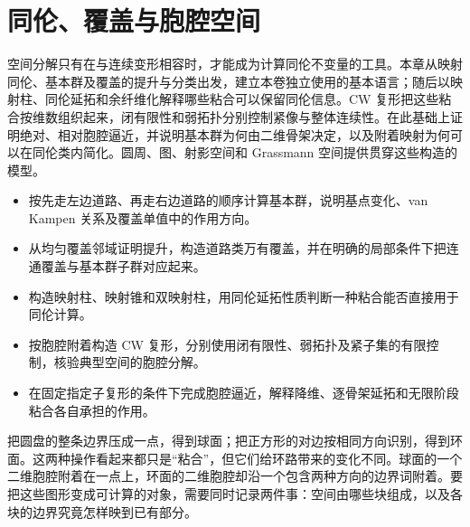 
% 
% 

\chapter{同伦、覆盖与胞腔空间}
\label{g2:ch:01}

\begin{chapterabstract}
	空间分解只有在与连续变形相容时，才能成为计算同伦不变量的工具。本章从映射同伦、基本群及覆盖的提升与分类出发，建立本卷独立使用的基本语言；随后以映射柱、同伦延拓和余纤维化解释哪些粘合可以保留同伦信息。CW 复形把这些粘合按维数组织起来，闭有限性和弱拓扑分别控制紧像与整体连续性。在此基础上证明绝对、相对胞腔逼近，并说明基本群为何由二维骨架决定，以及附着映射为何可以在同伦类内简化。圆周、图、射影空间和 Grassmann 空间提供贯穿这些构造的模型。
\end{chapterabstract}

\begin{learninggoals}
	\begin{itemize}
		\item 按先走左边道路、再走右边道路的顺序计算基本群，说明基点变化、van Kampen 关系及覆盖单值中的作用方向。
		\item 从均匀覆盖邻域证明提升，构造道路类万有覆盖，并在明确的局部条件下把连通覆盖与基本群子群对应起来。
		\item 构造映射柱、映射锥和双映射柱，用同伦延拓性质判断一种粘合能否直接用于同伦计算。
		\item 按胞腔附着构造 CW 复形，分别使用闭有限性、弱拓扑及紧子集的有限控制，核验典型空间的胞腔分解。
		\item 在固定指定子复形的条件下完成胞腔逼近，解释降维、逐骨架延拓和无限阶段粘合各自承担的作用。
	\end{itemize}
\end{learninggoals}

把圆盘的整条边界压成一点，得到球面；把正方形的对边按相同方向识别，得到环面。这两种操作看起来都只是“粘合”，但它们给环路带来的变化不同。球面的一个二维胞腔附着在一点上，环面的二维胞腔却沿一个包含两种方向的边界词附着。要把这些图形变成可计算的对象，需要同时记录两件事：空间由哪些块组成，以及各块的边界究竟怎样映到已有部分。

